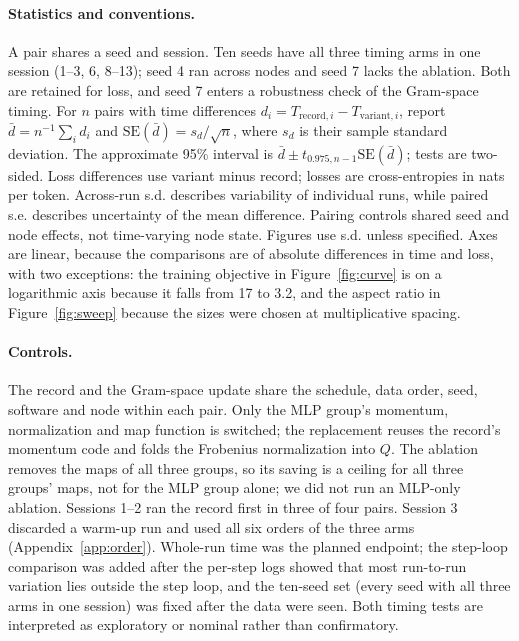\documentclass{article}
\begin{document}
\paragraph{Statistics and conventions.} A pair shares a seed and session. Ten seeds have all three timing arms in one session (1--3, 6, 8--13); seed 4 ran across nodes and seed 7 lacks the ablation. Both are retained for loss, and seed 7 enters a robustness check of the Gram-space timing. For $n$ pairs with time differences $d_i=T_{\mathrm{record},i}-T_{\mathrm{variant},i}$, report $\bar d=n^{-1}\sum_i d_i$ and $\mathrm{SE}(\bar d)=s_d/\sqrt n$, where $s_d$ is their sample standard deviation. The approximate 95\% interval is $\bar d\pm t_{0.975,n-1}\mathrm{SE}(\bar d)$; tests are two-sided. Loss differences use variant minus record; losses are cross-entropies in nats per token. Across-run s.d. describes variability of individual runs, while paired s.e. describes uncertainty of the mean difference. Pairing controls shared seed and node effects, not time-varying node state. Figures use s.d. unless specified. Axes are linear, because the comparisons are of absolute differences in time and loss, with two exceptions: the training objective in Figure~\ref{fig:curve} is on a logarithmic axis because it falls from 17 to 3.2, and the aspect ratio in Figure~\ref{fig:sweep} because the sizes were chosen at multiplicative spacing.

\paragraph{Controls.} The record and the Gram-space update share the schedule, data order, seed, software and node within each pair. Only the MLP group's momentum, normalization and map function is switched; the replacement reuses the record's momentum code and folds the Frobenius normalization into $Q$. The ablation removes the maps of all three groups, so its saving is a ceiling for all three groups' maps, not for the MLP group alone; we did not run an MLP-only ablation. Sessions 1--2 ran the record first in three of four pairs. Session 3 discarded a warm-up run and used all six orders of the three arms (Appendix~\ref{app:order}). Whole-run time was the planned endpoint; the step-loop comparison was added after the per-step logs showed that most run-to-run variation lies outside the step loop, and the ten-seed set (every seed with all three arms in one session) was fixed after the data were seen. Both timing tests are interpreted as exploratory or nominal rather than confirmatory.
\end{document}
